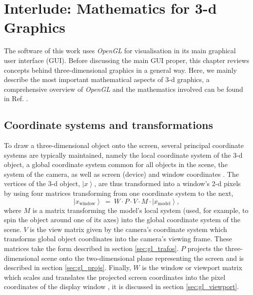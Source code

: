 %
%

\chapter{Interlude: Mathematics for 3-d Graphics}
\label{ch:gl}

The software of this work uses \textit{OpenGL} \cite{web_OpenGL} for visualisation in its main graphical user interface (GUI).
Before discussing the main GUI proper, this chapter reviews concepts behind three-dimensional graphics in a general way.
Here, we mainly describe the most important mathematical aspects of 3-d graphics, a comprehensive overview of 
\textit{OpenGL} and the mathematics involved can be found in Ref. \cite{Sellers2002}.



\section{Coordinate systems and transformations}
To draw a three-dimensional object onto the screen, several principal coordinate systems are typically maintained,
namely the local coordinate system of the 3-d object, a global coordinate system common for all objects in the scene, the
system of the camera, as well as screen (device) and window coordinates \cite[pp. 63-66]{Sellers2002}.
The vertices of the 3-d object, $\left|x\right>$, are thus transformed into a window's 2-d pixels by using four
matrices transforming from one coordinate system to the next,
\begin{equation}
	\boxed{\left|x_{\mathrm{window}}\right> \ =\ W \cdot P \cdot V \cdot  M \cdot  \left| x_{\mathrm{model}} \right>,}
	\label{eq:gl_mvp}
\end{equation}
where $M$ is a matrix transforming the model's local system (used, for example, to spin the object around one of
its axes) into the global coordinate system of the scene. $V$ is the view matrix given by the camera's coordinate system
which transforms global object coordinates into the camera's viewing frame. These matrices take the form
described in section \ref{sec:gl_trafos}.
$P$ projects the three-dimensional scene onto the two-dimensional plane representing the screen \cite{web_gl_ortho, web_gl_perspective} and is described in section \ref{sec:gl_projs}. 
Finally, $W$ is the window or viewport matrix which scales and translates the projected screen coordinates 
into the pixel coordinates of the display window \cite{web_gl_viewport}, it is discussed in section \ref{sec:gl_viewport}.

